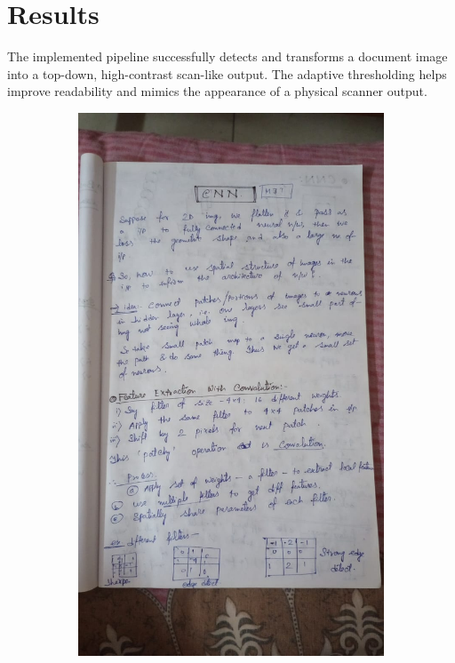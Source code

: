 \documentclass[12pt]{article}
\begin{document}
\section{Results}
The implemented pipeline successfully detects and transforms a document image into a top-down, high-contrast scan-like output. The adaptive thresholding helps improve readability and mimics the appearance of a physical scanner output.
\begin{figure}[H]
    \centering
    \begin{subfigure}[b]{0.45\textwidth}
        \includegraphics[width=\textwidth]{doc.jpg}

\end{subfigure}
\end{figure}
\end{document}
